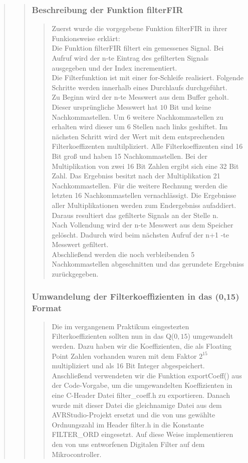 \begin{quote}
\begin{quote}
    	\subsubsection{Beschreibung der Funktion filterFIR}
    	\begin{quote}
    	Zuerst wurde die vorgegebene Funktion filterFIR in ihrer Funkionsweise
    	erklärt:\\ 
    	Die Funktion filterFIR filtert ein gemessenes Signal. Bei Aufruf
    	wird der n-te Eintrag des gefilterten Signals ausgegeben und der Index incrementiert.\\
    	Die Filterfunktion ist mit einer for-Schleife realisiert. Folgende Schritte werden innerhalb eines Durchlaufs
    	durchgeführt.\\
    	Zu Beginn wird der n-te Messwert aus dem Buffer geholt. Dieser ursprüngliche Messwert hat $10$ Bit und keine
    	Nachkommastellen. Um $6$ weitere Nachkommastellen zu erhalten wird dieser um 6 Stellen nach links geshiftet. Im
        nächsten Schritt wird der Wert mit dem entsprechenden Filterkoeffizenten multilpliziert. Alle Filterkoeffizenten
        sind 16 Bit groß und haben 15 Nachkommastellen. Bei der Multiplikation
        von zwei 16 Bit Zahlen ergibt sich eine 32 Bit Zahl. Das Ergebniss
        besitzt nach der Multiplikation 21 Nachkommastellen. Für die weitere Rechnung werden die letzten 16 Nachkommastellen vernachlässigt. 
        Die Ergebnisse aller Multiplikationen werden zum Endergebniss
        aufaddiert. Daraus resultiert das gefilterte Signals an der Stelle n.\\
        Nach Vollendung wird der n-te Messwert aus dem Speicher gelöscht.
        Dadurch wird beim nächsten Aufruf der n+1 -te Messwert gefiltert.\\
        Abschließend werden die noch verbleibenden 5 Nachkommastellen abgeschnitten und das gerundete Ergebniss
        zurückgegeben.
        
		\end{quote}
		
		\subsubsection{Umwandelung der Filterkoeffizienten in das (0,15) Format}
		\begin{quote}
		
		Die im vergangenem Praktikum eingestezten Filterkoeffizienten sollten nun in
		das Q($0,15$) umgewandelt werden. Dazu haben wir die Koeffizienten, die als Floating Point Zahlen vorhanden waren mit
		dem Faktor $2^{15}$ multipliziert und als 16 Bit Integer abgespeichert.\\ 
		Anschließend verwendeten wir die Funktion exportCoeff() aus der Code-Vorgabe,
		um die umgewandelten Koeffizienten in eine C-Header Datei filter\_coeff.h zu
		exportieren. Danach wurde mit dieser Datei die gleichnamige Datei aus dem
		AVRStudio-Projekt ersetzt und die von uns gewählte Ordnungszahl im Header
		filter.h in die Konstante FILTER\_ORD eingesetzt. Auf diese Weise implementieren den von uns entworfenen Digitalen
		Filter auf dem Mikrocontroller.
		

\end{quote}
\end{quote}
\end{quote}
